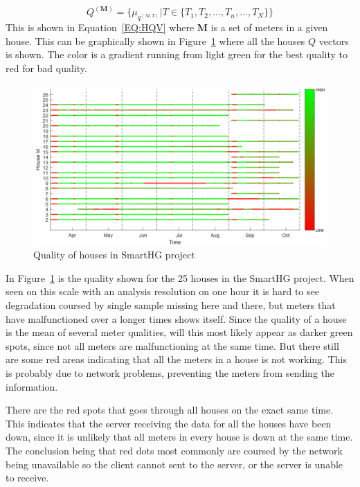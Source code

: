 \begin{equation}
	Q^{(\mathbf{M})} = \{ \mu_{q^{(M,T)}} | T \in \{T_1, T_2, ... ,T_n,..., T_N  \} \}
	\label{EQ:HQV}
\end{equation}
This is shown in Equation~\ref{EQ:HQV} where $\mathbf{M}$ is a set of meters in a given house. This can be graphically shown in Figure~\ref{fig:SmartHGQuality} where all the houses $Q$ vectors is shown. The color is a gradient running from light green for the best quality to red for bad quality.
\begin{figure}[H]
\centering
\includegraphics[width=1\textwidth]{billeder/QualityBig.png}
\caption{Quality of houses in SmartHG project}
\label{fig:SmartHGQuality}
\end{figure} 

In Figure~\ref{fig:SmartHGQuality} is the  quality shown for the 25 houses in the SmartHG project. When seen on this scale with an analysis resolution on one hour it is hard to see degradation coursed by single sample missing here and there, but meters that have malfunctioned over a longer times shows itself. Since the quality of a house is the mean of several meter qualities, will this most likely appear as darker green spots, since not all meters are malfunctioning at the same time. But there still are some red areas indicating that all the meters in a house is not working. This is probably due to network problems, preventing the meters from sending the information.

There are the red spots that goes through all houses on the exact same time. This indicates that the server receiving the data for all the houses have been down, since it is unlikely that all meters in every house is down at the same time. The conclusion being that red dots most commonly are coursed by the network being unavailable so the client cannot sent to the server, or the server is unable to receive. 

